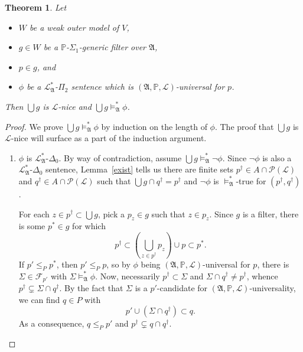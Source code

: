 \documentclass[12pt, twoside]{memoir}
\numberwithin{equation}{section}
\newtheorem{thm}{Theorem}[section]
\theoremstyle{definition}
\theoremstyle{remark}
\theoremstyle{definition}
\theoremstyle{definition}
\theoremstyle{definition}
\theoremstyle{remark}
\begin{document}
\begin{thm}\label{uni}
Let 
\begin{itemize} 
    \item $W$ be a weak outer model of $V$,
    \item $g \in W$ be a $\mathbb{P}$-$\Sigma_1$-generic filter over $\mathfrak{A}$,
    \item $p \in g$, and
    \item $\phi$ be a $\mathcal{L}^{*}_{\mathfrak{A}}$-$\Pi_2$ sentence which is $(\mathfrak{A}, \mathbb{P}, \mathcal{L})$-universal for $p$.
\end{itemize} 
Then $\bigcup g$ is $\mathcal{L}$-nice and $\bigcup g \models^{*}_{\mathfrak{A}} \phi$.
\end{thm}
\begin{proof}
We prove $\bigcup g \models^{*}_{\mathfrak{A}} \phi$ by induction on the length of $\phi$. The proof that $\bigcup g$ is $\mathcal{L}$-nice will surface as a part of the induction argument.
\begin{enumerate}[label=Case \arabic*:, leftmargin=50pt]
    \item\label{526c1} $\phi$ is $\mathcal{L}^{*}_{\mathfrak{A}}$-$\Delta_0$. By way of contradiction, assume $\bigcup g \models^{*}_{\mathfrak{A}} \neg \phi$. Since $\neg \phi$ is also a $\mathcal{L}^{*}_{\mathfrak{A}}$-$\Delta_0$ sentence, Lemma~\ref{exist} tells us there are finite sets $p^{\dagger} \in A \cap \mathcal{P}(\mathcal{L})$ and $q^{\dagger} \in A \cap \mathcal{P}(\mathcal{L})$ such that $\bigcup g \cap q^{\dagger} = p^{\dagger}$ and $\neg \phi$ is $\models^{*}_{\mathfrak{A}}$-true for $(p^{\dagger}, q^{\dagger})$.

    For each $z \in p^{\dagger} \subset \bigcup g$, pick a $p_z \in g$ such that $z \in p_z$. Since $g$ is a filter, there is some $p^* \in g$ for which $$p^{\dagger} \subset (\bigcup_{z \in p^{\dagger}} p_z) \cup p \subset p^*.$$ If $p' \leq_{P} p^*$, then $p' \leq_{P} p$, so by $\phi$ being $(\mathfrak{A}, \mathbb{P}, \mathcal{L})$-universal for $p$, there is $\Sigma \in \mathcal{F}_{p'}$ with $\Sigma \models^*_{\mathfrak{A}} \phi$. Now, necessarily $p^{\dagger} \subset \Sigma$ and $\Sigma \cap q^{\dagger} \neq p^{\dagger}$, whence $p^{\dagger} \subsetneq \Sigma \cap q^{\dagger}$. By the fact that $\Sigma$ is a $p'$-candidate for $(\mathfrak{A}, \mathbb{P}, \mathcal{L})$-universality, we can find $q \in P$ with $$p' \cup (\Sigma \cap q^{\dagger}) \subset q.$$ As a consequence, $q \leq_P p'$ and $p^{\dagger} \subsetneq q \cap q^{\dagger}$.
    

\end{enumerate}
\end{proof}
\end{document}
